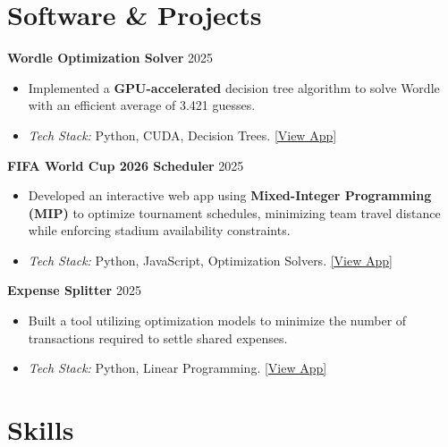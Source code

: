 \documentclass[a4paper,11pt]{article}
\begin{document}
\section{\textbf{Software \& Projects}}
\vspace{2mm}

\textbf{Wordle Optimization Solver} \hspace*{\fill} 2025
\vspace{-1mm}
\begin{itemize}[leftmargin=10pt]
    \item Implemented a \textbf{GPU-accelerated} decision tree algorithm to solve Wordle with an efficient average of 3.421 guesses.
    \item \textit{Tech Stack:} Python, CUDA, Decision Trees. \href{https://igorlucindo.github.io/wordle-optimization-GAME/}{\color{darkblue}[View App]}
\end{itemize}

\textbf{FIFA World Cup 2026 Scheduler} \hspace*{\fill} 2025
\vspace{-1mm}
\begin{itemize}[leftmargin=10pt]
    \item Developed an interactive web app using \textbf{Mixed-Integer Programming (MIP)} to optimize tournament schedules, minimizing team travel distance while enforcing stadium availability constraints.
    \item \textit{Tech Stack:} Python, JavaScript, Optimization Solvers. \href{https://igorlucindo.github.io/fifa-world-cup-2026-scheduler-APP/}{\color{darkblue}[View App]}
\end{itemize}


\textbf{Expense Splitter} \hspace*{\fill} 2025
\vspace{-1mm}
\begin{itemize}[leftmargin=10pt]
    \item Built a tool utilizing optimization models to minimize the number of transactions required to settle shared expenses.
    \item \textit{Tech Stack:} Python, Linear Programming. \href{https://igorlucindo.github.io/expense-splitter-APP/}{\color{darkblue}[View App]}
\end{itemize}


\section{\textbf{Skills}}
\vspace{2mm}
\end{document}
